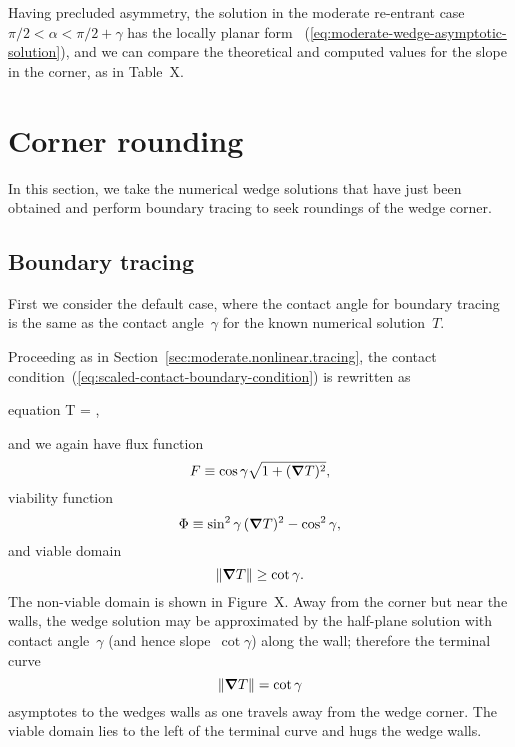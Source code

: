 Having precluded asymmetry,
the solution in the moderate re-entrant case~$\pi/2 < \alpha < \pi/2 + \gamma$
has the locally planar form~%
  (\ref{eq:moderate-wedge-asymptotic-solution}),
and we can compare the theoretical and computed values
for the slope in the corner,
as in Table~X. %

\section{Corner rounding}
\label{sec:re-entrant.rounding}

In this section,
we take the numerical wedge solutions that have just been obtained
and perform boundary tracing
to seek roundings of the wedge corner.

\subsection{Boundary tracing}
\label{sec:re-entrant.rounding.tracing}

First we consider the default case,
where the contact angle for boundary tracing
is the same as the contact angle~$\gamma$
for the known numerical solution~$T$.

Proceeding as in Section~\ref{sec:moderate.nonlinear.tracing},
the contact condition~(\ref{eq:scaled-contact-boundary-condition})
is rewritten as
\begin{important}{equation}
  \normalvec \dotp \del T = \cos\gamma {},
  \label{eq:scaled-contact-flux-boundary-condition-repeat_re-entrant}
\end{important}
and we again have flux function
\begin{equation}
  F \equiv \cos\gamma \sqrt{1 + (\mathop{}\!\boldsymbol{\mathbf{\nabla}} T)^2},
  \label{eq:contact-flux-function-repeat_re-entrant}
\end{equation}
viability function
\begin{equation}
  \Phi \equiv \sin^2\gamma \, (\mathop{}\!\boldsymbol{\mathbf{\nabla}} T)^2 - \cos^2\gamma,
  \label{eq:contact-viability-function-repeat_re-entrant}
\end{equation}
and viable domain
\begin{equation}
  \lVert\mathop{}\!\boldsymbol{\mathbf{\nabla}} T\rVert \ge \cot\gamma.
  \label{eq:contact-viable-domain-repeat_re-entrant}
\end{equation}
The non-viable domain is shown
in Figure~X. %
Away from the corner but near the walls,
the wedge solution may be approximated by the half-plane solution
with contact angle~$\gamma$
(and hence slope~$\cot\gamma$)
along the wall;
therefore the terminal curve
\begin{equation}
  \lVert\mathop{}\!\boldsymbol{\mathbf{\nabla}} T\rVert = \cot\gamma
  \label{eq:contact-terminal-curve-repeat_re-entrant}
\end{equation}
asymptotes to the wedges walls as one travels away from the wedge corner.
The viable domain lies to the left of the terminal curve
and hugs the wedge walls.

